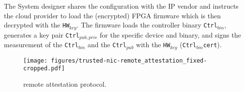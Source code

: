 \fi

 The System designer shares the configuration with the IP vendor and instructs the cloud provider to load the (encrypted) FPGA firmware which is then decrypted with the \texttt{HW$_{key}$}. 
The firmware loads the controller binary \texttt{Ctrl$_{bin}$}, generates a key pair \texttt{Ctrl$_{pub, priv}$} for the specific device and binary, and signs the measurement of the \texttt{Ctrl$_{bin}$} and the \texttt{Ctrl$_{pub}$} with the  \texttt{HW$_{key}$} (\texttt{Ctrl$_{bin}$cert}). %



\begin{figure}[t!]
    \centering
    \texttt{[image: figures/trusted-nic-remote\_attestation\_fixed-cropped.pdf]}
    \caption{\projecttitle{} remote attestation protocol.}
    \label{fig:remote_attestation}
\end{figure}

